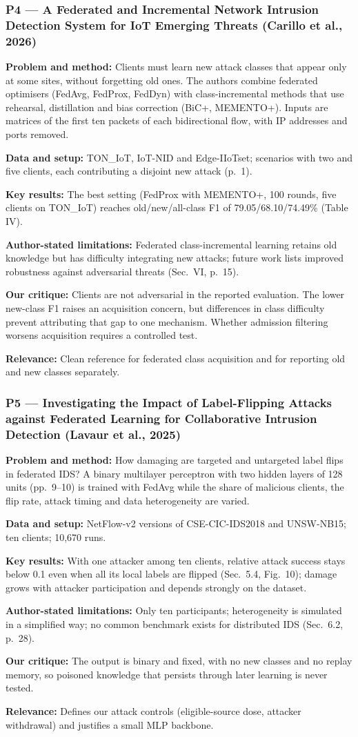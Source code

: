 \documentclass[10pt,a4paper]{article}
\newcommand{\sumitem}[2]{\noindent\textbf{#1:} #2\par}
\begin{document}
\subsubsection*{P4 --- A Federated and Incremental Network Intrusion Detection System for IoT Emerging Threats (Carillo et al., 2026)}
\sumitem{Problem and method}{Clients must learn new attack classes that appear only at some sites, without forgetting old ones. The authors combine federated optimisers (FedAvg, FedProx, FedDyn) with class-incremental methods that use rehearsal, distillation and bias correction (BiC+, MEMENTO+). Inputs are matrices of the first ten packets of each bidirectional flow, with IP addresses and ports removed.}
\sumitem{Data and setup}{TON\_IoT, IoT-NID and Edge-IIoTset; scenarios with two and five clients, each contributing a disjoint new attack (p.~1).}
\sumitem{Key results}{The best setting (FedProx with MEMENTO+, 100 rounds, five clients on TON\_IoT) reaches old/new/all-class F1 of 79.05/68.10/74.49\% (Table IV).}
\sumitem{Author-stated limitations}{Federated class-incremental learning retains old knowledge but has difficulty integrating new attacks; future work lists improved robustness against adversarial threats (Sec.~VI, p.~15).}
\sumitem{Our critique}{Clients are not adversarial in the reported evaluation. The lower new-class F1 raises an acquisition concern, but differences in class difficulty prevent attributing that gap to one mechanism. Whether admission filtering worsens acquisition requires a controlled test.}
\sumitem{Relevance}{Clean reference for federated class acquisition and for reporting old and new classes separately.}

\subsubsection*{P5 --- Investigating the Impact of Label-Flipping Attacks against Federated Learning for Collaborative Intrusion Detection (Lavaur et al., 2025)}
\sumitem{Problem and method}{How damaging are targeted and untargeted label flips in federated IDS? A binary multilayer perceptron with two hidden layers of 128 units (pp.~9--10) is trained with FedAvg while the share of malicious clients, the flip rate, attack timing and data heterogeneity are varied.}
\sumitem{Data and setup}{NetFlow-v2 versions of CSE-CIC-IDS2018 and UNSW-NB15; ten clients; 10,670 runs.}
\sumitem{Key results}{With one attacker among ten clients, relative attack success stays below 0.1 even when all its local labels are flipped (Sec.~5.4, Fig.~10); damage grows with attacker participation and depends strongly on the dataset.}
\sumitem{Author-stated limitations}{Only ten participants; heterogeneity is simulated in a simplified way; no common benchmark exists for distributed IDS (Sec.~6.2, p.~28).}
\sumitem{Our critique}{The output is binary and fixed, with no new classes and no replay memory, so poisoned knowledge that persists through later learning is never tested.}
\sumitem{Relevance}{Defines our attack controls (eligible-source dose, attacker withdrawal) and justifies a small MLP backbone.}
\end{document}
